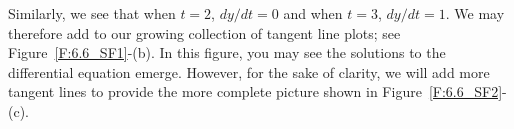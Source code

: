 Similarly, we see that when $t=2$, $dy/dt = 0$ and when $t=3$, $dy/dt=1$.  We may therefore add to our growing collection of tangent line plots; see Figure~\ref{F:6.6_SF1}-(b). In this figure, you may see the solutions to the differential equation emerge.  However, for the sake of clarity, we will add more tangent lines to provide the more complete picture shown in Figure~\ref{F:6.6_SF2}-(c).

\begin{figure} %
\begin{flushright}
\hspace{.5cm}
\hspace{.5cm}

\end{flushright}
\end{figure}
